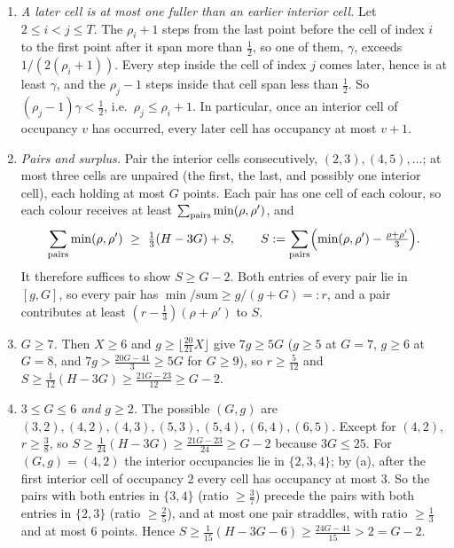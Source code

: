 \documentclass[11pt,a4paper]{article}
\begin{document}
\begin{enumerate}
\def\labelenumi{(\alph{enumi})}
\item
  \emph{A later cell is at most one fuller than an earlier interior
  cell.} Let \(2\le i<j\le T\). The \(\rho_i+1\) steps from the last
  point before the cell of index \(i\) to the first point after it span
  more than \(\tfrac12\), so one of them, \(\gamma\), exceeds
  \(1/(2(\rho_i+1))\). Every step inside the cell of index \(j\) comes
  later, hence is at least \(\gamma\), and the \(\rho_j-1\) steps inside
  that cell span less than \(\tfrac12\). So
  \((\rho_j-1)\gamma<\tfrac12\), i.e.~\(\rho_j\le\rho_i+1\). In
  particular, once an interior cell of occupancy \(v\) has occurred,
  every later cell has occupancy at most \(v+1\).
\item
  \emph{Pairs and surplus.} Pair the interior cells consecutively,
  \((2,3),(4,5),\dots\); at most three cells are unpaired (the first,
  the last, and possibly one interior cell), each holding at most \(G\)
  points. Each pair has one cell of each colour, so each colour receives
  at least \(\sum_{\rm pairs}\min(\rho,\rho')\), and \[
  \sum_{\rm pairs}\min(\rho,\rho')
  \ \ge\ \tfrac13(H-3G)+S,\qquad
  S:=\sum_{\rm pairs}\Bigl(\min(\rho,\rho')-\tfrac{\rho+\rho'}3\Bigr).
  \] It therefore suffices to show \(S\ge G-2\). Both entries of every
  pair lie in \([g,G]\), so every pair has
  \(\min/\mathrm{sum}\ge g/(g+G)=:r\), and a pair contributes at least
  \((r-\tfrac13)(\rho+\rho')\) to \(S\).
\item
  \emph{\(G\ge 7\).} Then \(X\ge 6\) and
  \(g\ge\lfloor\tfrac{20}{21}X\rfloor\) give \(7g\ge 5G\) (\(g\ge 5\) at
  \(G=7\), \(g\ge 6\) at \(G=8\), and \(7g>\tfrac{20G-41}3\ge 5G\) for
  \(G\ge 9\)), so \(r\ge\tfrac5{12}\) and
  \(S\ge\tfrac1{12}(H-3G)\ge\tfrac{21G-23}{12}\ge G-2\).
\item
  \emph{\(3\le G\le 6\) and \(g\ge 2\).} The possible \((G,g)\) are
  \((3,2),(4,2),(4,3),(5,3),(5,4),(6,4),(6,5)\). Except for \((4,2)\),
  \(r\ge\tfrac38\), so
  \(S\ge\tfrac1{24}(H-3G)\ge\tfrac{21G-23}{24}\ge G-2\) because
  \(3G\le 25\). For \((G,g)=(4,2)\) the interior occupancies lie in
  \(\{2,3,4\}\); by (a), after the first interior cell of occupancy
  \(2\) every cell has occupancy at most \(3\). So the pairs with both
  entries in \(\{3,4\}\) (ratio \(\ge\tfrac37\)) precede the pairs with
  both entries in \(\{2,3\}\) (ratio \(\ge\tfrac25\)), and at most one
  pair straddles, with ratio \(\ge\tfrac13\) and at most \(6\) points.
  Hence \(S\ge\tfrac1{15}(H-3G-6)\ge\tfrac{24G-41}{15}>2=G-2\).

\end{enumerate}
\end{document}
